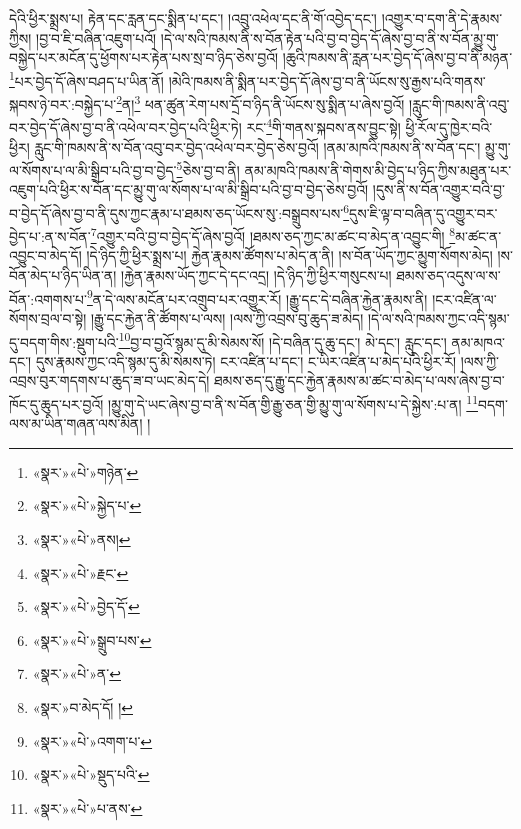 དེའི་ཕྱིར་སྨྲས་པ། རྟེན་དང་རླན་དང་སྨིན་པ་དང་། །འབྲུ་འཕེལ་དང་ནི་གོ་འབྱེད་དང་། །འགྱུར་བ་དག་ནི་དེ་རྣམས་ཀྱིས། །བྱ་བ་ཇི་བཞིན་འཇུག་པའོ། །དེ་ལ་སའི་ཁམས་ནི་ས་བོན་རྟེན་པའི་བྱ་བ་བྱེད་དོ་ཞེས་བྱ་བ་ནི་ས་བོན་མྱུ་གུ་བསྐྱེད་པར་མངོན་དུ་ཕྱོགས་པར་རྟེན་པས་སྲ་བ་ཉིད་ཅེས་བྱའོ། །ཆུའི་ཁམས་ནི་རླན་པར་བྱེད་དོ་ཞེས་བྱ་བ་ནི་མཉན་\footnote{«སྣར་»«པེ་»གཉེན་}པར་བྱེད་དོ་ཞེས་བཤད་པ་ཡིན་ནོ། །མེའི་ཁམས་ནི་སྨིན་པར་བྱེད་དོ་ཞེས་བྱ་བ་ནི་ཡོངས་སུ་རྒྱས་པའི་གནས་སྐབས་ཉེ་བར་:བསྐྱེད་པ་\footnote{«སྣར་»«པེ་»སྐྱེད་པ་}ན།\footnote{«སྣར་»«པེ་»ནས།} ཕན་ཚུན་རེག་པས་དྲོ་བ་ཉིད་ནི་ཡོངས་སུ་སྨིན་པ་ཞེས་བྱའོ། །རླུང་གི་ཁམས་ནི་འབུ་བར་བྱེད་དོ་ཞེས་བྱ་བ་ནི་འཕེལ་བར་བྱེད་པའི་ཕྱིར་ཏེ། རང་\footnote{«སྣར་»«པེ་»རྗང་}གི་གནས་སྐབས་ནས་བྱུང་སྟེ། ཕྱི་རོལ་དུ་ཁྱེར་བའི་ཕྱིར། རླུང་གི་ཁམས་ནི་ས་བོན་འབུ་བར་བྱེད་འཕེལ་བར་བྱེད་ཅེས་བྱའོ། །ནམ་མཁའི་ཁམས་ནི་ས་བོན་དང་། མྱུ་གུ་ལ་སོགས་པ་ལ་མི་སྒྲིབ་པའི་བྱ་བ་བྱེད་\footnote{«སྣར་»«པེ་»བྱེད་དོ་}ཅེས་བྱ་བ་ནི། ནམ་མཁའི་ཁམས་ནི་གེགས་མི་བྱེད་པ་ཉིད་ཀྱིས་མཐུན་པར་འཇུག་པའི་ཕྱིར་ས་བོན་དང་མྱུ་གུ་ལ་སོགས་པ་ལ་མི་སྒྲིབ་པའི་བྱ་བ་བྱེད་ཅེས་བྱའོ། །དུས་ནི་ས་བོན་འགྱུར་བའི་བྱ་བ་བྱེད་དོ་ཞེས་བྱ་བ་ནི་དུས་ཀྱང་རྣམ་པ་ཐམས་ཅད་ཡོངས་སུ་:བསྒྲུབས་པས་\footnote{«སྣར་»«པེ་»སྒྲུབ་པས་}དུས་ཇི་ལྟ་བ་བཞིན་དུ་འགྱུར་བར་བྱེད་པ་:ན་ས་བོན་\footnote{«སྣར་»«པེ་»ན་}འགྱུར་བའི་བྱ་བ་བྱེད་དོ་ཞེས་བྱའོ། །ཐམས་ཅད་ཀྱང་མ་ཚང་བ་མེད་ན་འབྱུང་གི། \footnote{«སྣར་»བ་མེད་དོ། ། }མ་ཚང་ན་འབྱུང་བ་མེད་དོ། །དེ་ཉིད་ཀྱི་ཕྱིར་སྨྲས་པ། རྐྱེན་རྣམས་ཚོགས་པ་མེད་ན་ནི། །ས་བོན་ཡོད་ཀྱང་མྱུག་སོགས་མེད། །ས་བོན་མེད་པ་ཉིད་ཡིན་ན། །རྐྱེན་རྣམས་ཡོད་ཀྱང་དེ་དང་འདྲ། །དེ་ཉིད་ཀྱི་ཕྱིར་གསུངས་པ། ཐམས་ཅད་འདུས་ལ་ས་བོན་:འགགས་པ་\footnote{«སྣར་»«པེ་»འགག་པ་}ན་དེ་ལས་མངོན་པར་འགྲུབ་པར་འགྱུར་རོ། །རྒྱུ་དང་དེ་བཞིན་རྐྱེན་རྣམས་ནི། །ངར་འཛིན་ལ་སོགས་བྲལ་བ་སྟེ། །རྒྱུ་དང་རྐྱེན་ནི་ཚོགས་པ་ལས། །ལས་ཀྱི་འབྲས་བུ་ཆུད་ཟ་མེད། །དེ་ལ་སའི་ཁམས་ཀྱང་འདི་སྙམ་དུ་བདག་གིས་:སྡུག་པའི་\footnote{«སྣར་»«པེ་»སྡུད་པའི་}བྱ་བ་བྱའོ་སྙམ་དུ་མི་སེམས་སོ། །དེ་བཞིན་དུ་ཆུ་དང་། མེ་དང་། རླུང་དང་། ནམ་མཁའ་དང་། དུས་རྣམས་ཀྱང་འདི་སྙམ་དུ་མི་སེམས་ཏེ། ངར་འཛིན་པ་དང་། ང་ཡིར་འཛིན་པ་མེད་པའི་ཕྱིར་རོ། །ལས་ཀྱི་འབྲས་བུར་གདགས་པ་ཆུད་ཟ་བ་ཡང་མེད་དེ། ཐམས་ཅད་དུ་རྒྱུ་དང་རྐྱེན་རྣམས་མ་ཚང་བ་མེད་པ་ལས་ཞེས་བྱ་བ་ཁོང་དུ་ཆུད་པར་བྱའོ། །མྱུ་གུ་དེ་ཡང་ཞེས་བྱ་བ་ནི་ས་བོན་གྱི་རྒྱུ་ཅན་གྱི་མྱུ་གུ་ལ་སོགས་པ་དེ་སྐྱེས་:པ་ན། \footnote{«སྣར་»«པེ་»པ་ནས་}བདག་ལས་མ་ཡིན་གཞན་ལས་མིན། །
